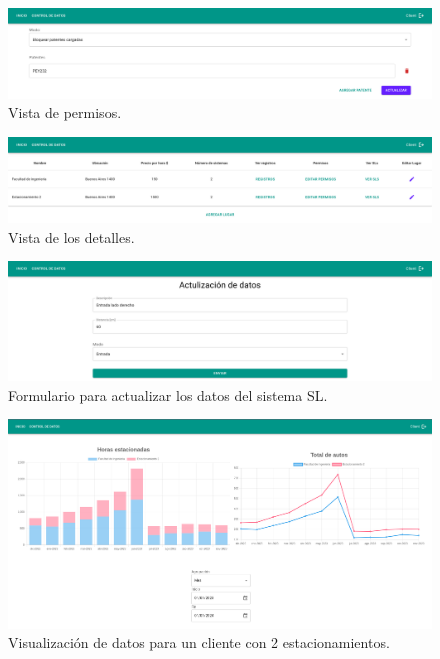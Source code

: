 \begin{figure}[!bth]
    \centering
    \includegraphics[width=.8\textwidth]{imgs/server/in-type.png}
    \caption{Vista de permisos.}
    \label{fig:in-type}
\end{figure}
\begin{figure}[!bth]
    \centering
    \includegraphics[width=.8\textwidth]{imgs/server/client-barriers-details.png}
    \caption{Vista de los detalles.}
    \label{fig:barrier-details}
\end{figure}

\begin{figure}[!bth]
    \centering
    \includegraphics[width=.8\textwidth]{imgs/server/barrier-update-data.png}
    \caption{Formulario para actualizar los datos del sistema SL.}
    \label{fig:update-barrier}
\end{figure}

\begin{figure}[!bth]
    \centering
    \includegraphics[width=.8\textwidth]{imgs/server/resume.png}
    \caption{Visualización de datos para un cliente con 2 estacionamientos.}
    \label{fig:dashboard}
\end{figure}

